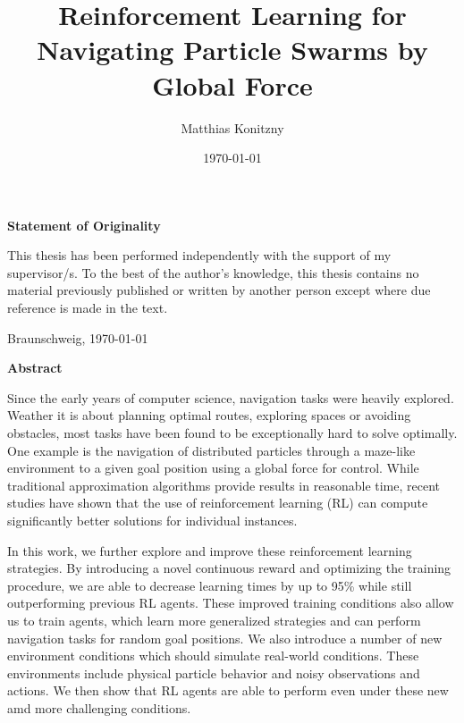 \documentclass[%
  a4paper,%
  11pt,%
  style=print,
  blue,%
  bibliography=totoc,
  nexus,
  lnum,
  extramargin,
  table
  ]{tubsbook}
\title{Reinforcement Learning for Navigating Particle Swarms by Global Force}
\author{Matthias Konitzny}
\date{\today}
\begin{document}
\maketitle

\frontmatter

\cleardoublepage


\thispagestyle{plain} %
\vspace*{7cm}
\centerline{\bfseries Statement of Originality}
\vspace*{1em}
\noindent
This thesis has been performed independently with the support of my supervisor/s.
To the best of the author's knowledge, this thesis contains no material previously
published or written by another person except where due reference is made in the text.

\par
  \bigskip\noindent Braunschweig, \today \par
  \vspace*{10mm}
  \hfill\hrulefill
\cleardoublepage

\thispagestyle{plain} %
\centerline{\bfseries Abstract}
\vspace*{1em}
\noindent
Since the early years of computer science, navigation tasks were heavily explored. Weather it is about planning optimal routes, exploring spaces or avoiding obstacles, most tasks have been found to be exceptionally hard to solve optimally. One example is the navigation of distributed particles through a maze-like environment to a given goal position using a global force for control. While traditional approximation algorithms provide results in reasonable time, recent studies have shown that the use of reinforcement learning (RL) can compute significantly better solutions for individual instances.

In this work, we further explore and improve these reinforcement learning strategies. By introducing a novel continuous reward and optimizing the training procedure, we are able to decrease learning times by up to 95\% while still outperforming previous RL agents. These improved training conditions also allow us to train agents, which learn more generalized strategies and can perform navigation tasks for random goal positions. We also introduce a number of new environment conditions which should simulate real-world conditions. These environments include physical particle behavior and noisy observations and actions. We then show that RL agents are able to perform even under these new amd more challenging conditions.  
\end{document}
